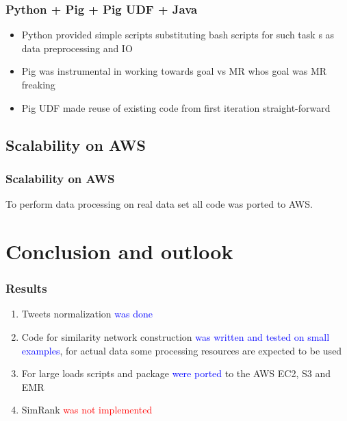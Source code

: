 \documentclass[handout]{beamer}
\begin{document}

\begin{frame}
\frametitle{\bf Python + Pig + Pig UDF + Java}

\begin{itemize}
\item Python provided simple scripts substituting bash scripts for such task s as data preprocessing and IO
\item Pig was instrumental in working towards goal vs MR whos goal was MR freaking
\item Pig UDF made reuse of existing code from first iteration straight-forward
\end{itemize}

\end{frame}


\subsection{Scalability on AWS}

\begin{frame}
\frametitle{\bf Scalability on AWS}

To perform data processing on real data set all code was ported to AWS.

\end{frame}


\section{Conclusion and outlook}

\begin{frame}
\frametitle{\bf Results}

\begin{enumerate}
\item Tweets normalization \textcolor{blue}{was done}
\item Code for similarity network construction \textcolor{blue}{was written and tested on small examples}, for actual data some processing resources are expected to be used
\item For large loads scripts and package \textcolor{blue}{were ported} to the AWS EC2, S3 and EMR
\item SimRank \textcolor{red}{was not implemented}
\end{enumerate}

\end{frame}
\end{document}
